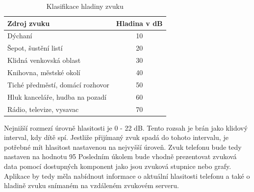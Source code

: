 \documentclass[journal, a4paper]{IEEEtran}
\begin{document}
\begin{table}[h!]
    \begin{center}
        \caption{Klasifikace hladiny zvuku}
        \label{tab:table1}
        \begin{tabular}{l|c}
            \textbf{Zdroj zvuku} & \textbf{Hladina v dB}\\
            \hline
            Dýchaní & 10\\
            Šepot, šustění listí & 20\\
            Klidná venkovská oblast & 30\\
            Knihovna, městské okolí & 40\\
            Tiché předměstí, domácí rozhovor & 50\\
            Hluk kanceláře, hudba na pozadí & 60\\
            Rádio, televize, vysavac & 70\\
        \end{tabular}
        \end{center}
\end{table}

    Nejnižší rozmezí úrovně hlasitosti je 0 - 22 dB. Tento rozsah je brán jako klidový interval, kdy dítě spí. Jestliže přijímaný zvuk spadá do tohoto intervalu, je potřebné mít hlasitost nastavenou na nejvyšší úroveň. Zvuk telefonu bude tedy nastaven na hodnotu 95 %
    Posledním úkolem bude vhodně prezentovat zvuková data pomocí dostupných komponent jako jsou zvuková stupnice nebo grafy. Aplikace by tedy měla nabídnout informace o aktuální hlasitosti telefonu a také o hladině zvuku snímaném na vzdáleném zvukovém serveru.



\end{document}

